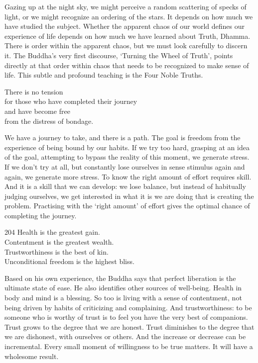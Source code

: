 \begin{dhpRefl}
Gazing up at the night sky, we might perceive a random scattering of specks of light, or we might recognize an ordering of the stars. It depends on how much we have studied the subject. Whether the apparent chaos of our world defines our experience of life depends on how much we have learned about Truth, Dhamma. There is order within the apparent chaos, but we must look carefully to discern it. The Buddha's very first discourse, `Turning the Wheel of Truth', points directly at that order within chaos that needs to be recognized to make sense of life. This subtle and profound teaching is the Four Noble Truths.
\end{dhpRefl}


\begin{dhpVerse}{90}
\label{dhp-90}
There is no tension\\
for those who have completed their journey\\
and have become free\\
from the distress of bondage.
\end{dhpVerse}

\begin{dhpRefl}
We have a journey to take, and there is a path. The goal is freedom from the experience of being bound by our habits. If we try too hard, grasping at an idea of the goal, attempting to bypass the reality of this moment, we generate stress. If we don't try at all, but constantly lose ourselves in sense stimulus again and again, we generate more stress. To know the right amount of effort requires skill. And it is a skill that we can develop: we lose balance, but instead of habitually judging ourselves, we get interested in what it is we are doing that is creating the problem. Practising with the `right amount' of effort gives the optimal chance of completing the journey.
\end{dhpRefl}


\begin{dhpVerse}{204}
\label{dhp-204}
Health is the greatest gain.\\
Contentment is the greatest wealth.\\
Trustworthiness is the best of kin.\\
Unconditional freedom is the highest bliss.
\end{dhpVerse}

\begin{dhpRefl}
Based on his own experience, the Buddha says that perfect liberation is the ultimate state of ease. He also identifies other sources of well-being. Health in body and mind is a blessing. So too is living with a sense of contentment, not being driven by habits of criticizing and complaining. And trustworthiness: to be someone who is worthy of trust is to feel you have the very best of companions. Trust grows to the degree that we are honest. Trust diminishes to the degree that we are dishonest, with ourselves or others. And the increase or decrease can be incremental. Every small moment of willingness to be true matters. It will have a wholesome result.
\end{dhpRefl}

